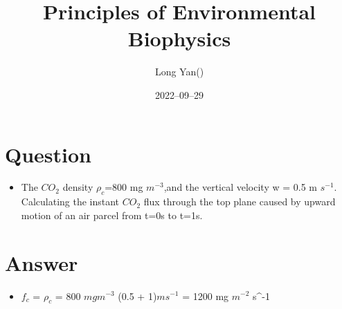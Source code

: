 \documentclass[12pt]{article}
\title{Principles of Environmental Biophysics}
\author{Long Yan()}
\date{2022–09–29}
\begin{document}
\maketitle

\section{Question}
\begin{itemize}
\item The $CO_2$ density $\rho_c$=800 mg $m^{-3}$,and the vertical velocity w = 0.5 m $s^{-1}$.
Calculating the instant $CO_2$ flux through the top plane caused by upward motion of an air parcel
from t=0s to t=1s.
\end{itemize}
\section{Answer}
\begin{itemize}
\item $f_c$ = $\rho_c$ \cdot {} =  800 $mg m^{-3}$  \cdot (0.5 + 1)$m s^{-1}$ = 1200 mg $m^{-2}$ s^{-1}
\end{itemize}
\end{document}
